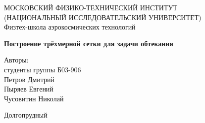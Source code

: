 \begin{titlepage}
\begin{center}
\large МОСКОВСКИЙ ФИЗИКО-ТЕХНИЧЕСКИЙ ИНСТИТУТ \\
(НАЦИОНАЛЬНЫЙ ИССЛЕДОВАТЕЛЬСКИЙ УНИВЕРСИТЕТ) \\
Физтех-школа аэрокосмических технологий 
\end{center}
\vspace{8cm}



\begin{center}
\begin{huge}
\textbf{Построение трёхмерной сетки для задачи обтекания}
\end{huge}
\end{center}

\vspace{4cm}

\begin{flushright}
\LARGE
Авторы:\\
студенты группы Б03-906\\
Петров Дмитрий\\
Пыряев Евгений\\
Чусовитин Николай\\
\end{flushright}

\vfill

\begin{center}
Долгопрудный \the\year
\end{center}
\end{titlepage}